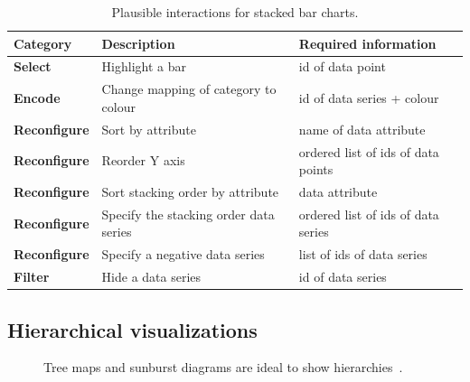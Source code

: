 \begin{table}[H]
  \caption{Plausible interactions for stacked bar charts.}%
  \label{tab:analysis:stacked-bar-chart:interactions}
  \begin{tabularx}{\linewidth}{lXX}
    \bf Category & \bf Description & \bf Required information \\
    \hline
    \bf Select & Highlight a bar & id of data point \\
    \bf Encode & Change mapping of category to colour & id of data series + colour \\
    \bf Reconfigure & Sort by attribute & name of data attribute \\
    \bf Reconfigure & Reorder Y axis & ordered list of ids of data points \\
    \bf Reconfigure & Sort stacking order by attribute & data attribute \\
    \bf Reconfigure & Specify the stacking order data series & ordered list of ids of data series \\
    \bf Reconfigure & Specify a negative data series & list of ids of data series \\
    \bf Filter & Hide a data series & id of data series \\
  \end{tabularx}
\end{table}


\subsection{Hierarchical visualizations}

\begin{figure}
  \centering
  \qquad
  \caption{Tree maps and sunburst diagrams are ideal to show hierarchies~\parencite{VisualizationCatalogue2017}.}%
  \label{fig:analysis:hierarchies}
\end{figure}

